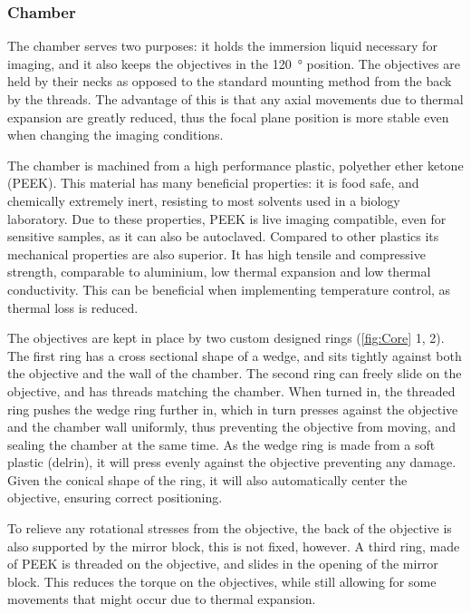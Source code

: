    \subsubsection{Chamber}
    The chamber serves two purposes: it holds the immersion liquid necessary for imaging, and it also keeps the objectives in the \SI{120}{\degree} position. The objectives are held by their necks as opposed to the standard mounting method from the back by the threads. The advantage of this is that any axial movements due to thermal expansion are greatly reduced, thus the focal plane position is more stable even when changing the imaging conditions.

    The chamber is machined from a high performance plastic, polyether ether ketone (PEEK). This material has many beneficial properties: it is food safe, and chemically extremely inert, resisting to most solvents used in a biology laboratory. Due to these properties, PEEK is live imaging compatible, even for sensitive samples, as it can also be autoclaved. Compared to other plastics its mechanical properties are also superior. It has high tensile and compressive strength, comparable to aluminium, low thermal expansion and low thermal conductivity. This can be beneficial when implementing temperature control, as thermal loss is reduced.

    The objectives are kept in place by two custom designed rings (\autoref{fig:Core} 1, 2). The first ring has a cross sectional shape of a wedge, and sits tightly against both the objective and the wall of the chamber. The second ring can freely slide on the objective, and has threads matching the chamber. When turned in, the threaded ring pushes the wedge ring further in, which in turn presses against the objective and the chamber wall uniformly, thus preventing the objective from moving, and sealing the chamber at the same time. As the wedge ring is made from a soft plastic (delrin), it will press evenly against the objective preventing any damage. Given the conical shape of the ring, it will also automatically center the objective, ensuring correct positioning.

    To relieve any rotational stresses from the objective, the back of the objective is also supported  by the mirror block, this is not fixed, however. A third ring, made of PEEK is threaded on the objective, and slides in the opening of the mirror block. This reduces the torque on the objectives, while still allowing for some movements that might occur due to thermal expansion.

